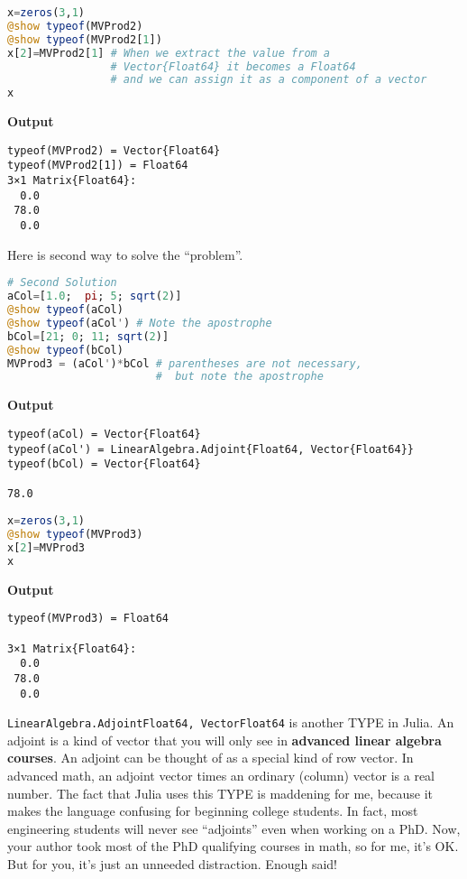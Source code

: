 \begin{lstlisting}[language=Julia,style=mystyle]
x=zeros(3,1)
@show typeof(MVProd2)
@show typeof(MVProd2[1])
x[2]=MVProd2[1] # When we extract the value from a 
                # Vector{Float64} it becomes a Float64
                # and we can assign it as a component of a vector
x
\end{lstlisting}
\textbf{Output} 
\begin{verbatim}
typeof(MVProd2) = Vector{Float64}
typeof(MVProd2[1]) = Float64
3×1 Matrix{Float64}:
  0.0
 78.0
  0.0
\end{verbatim}

Here is second way to solve the ``problem''. 
\begin{lstlisting}[language=Julia,style=mystyle]
# Second Solution
aCol=[1.0;  pi; 5; sqrt(2)]
@show typeof(aCol)
@show typeof(aCol') # Note the apostrophe
bCol=[21; 0; 11; sqrt(2)]
@show typeof(bCol)
MVProd3 = (aCol')*bCol # parentheses are not necessary, 
                       #  but note the apostrophe
\end{lstlisting}
\textbf{Output} 
\begin{verbatim}
typeof(aCol) = Vector{Float64}
typeof(aCol') = LinearAlgebra.Adjoint{Float64, Vector{Float64}}
typeof(bCol) = Vector{Float64}

78.0
\end{verbatim}


\begin{lstlisting}[language=Julia,style=mystyle]
x=zeros(3,1)
@show typeof(MVProd3)
x[2]=MVProd3
x
\end{lstlisting}
\textbf{Output} 
\begin{verbatim}
typeof(MVProd3) = Float64

3×1 Matrix{Float64}:
  0.0
 78.0
  0.0
\end{verbatim}

\texttt{LinearAlgebra.Adjoint{Float64, Vector{Float64}}} is another TYPE in Julia. An adjoint is a kind of vector that you will only see in \textbf{advanced linear algebra courses}. An adjoint can be thought of as a special kind of row vector. In advanced math, an adjoint vector times an ordinary (column) vector is a real number. The fact that Julia uses this TYPE is maddening for me, because it makes the language confusing for beginning college students. In fact, most engineering students will never see ``adjoints'' even when working on a PhD. Now, your author took most of the PhD qualifying courses in math, so for me, it's OK. But for you, it's just an unneeded distraction. Enough said! 


